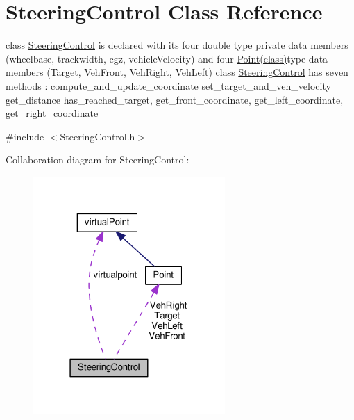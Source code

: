 \hypertarget{classSteeringControl}{}\section{Steering\+Control Class Reference}
\label{classSteeringControl}


class \hyperlink{classSteeringControl}{Steering\+Control} is declared with its four double type private data members (wheelbase, trackwidth, cgz, vehicle\+Velocity) and four \hyperlink{classPoint}{Point(class)}type data members (Target, Veh\+Front, Veh\+Right, Veh\+Left) class \hyperlink{classSteeringControl}{Steering\+Control} has seven methods \+: compute\+\_\+and\+\_\+update\+\_\+coordinate set\+\_\+target\+\_\+and\+\_\+veh\+\_\+velocity get\+\_\+distance has\+\_\+reached\+\_\+target, get\+\_\+front\+\_\+coordinate, get\+\_\+left\+\_\+coordinate, get\+\_\+right\+\_\+coordinate  




{\ttfamily \#include $<$Steering\+Control.\+h$>$}



Collaboration diagram for Steering\+Control\+:
\nopagebreak
\begin{figure}[H]
\begin{center}
\leavevmode
\includegraphics[width=207pt]{classSteeringControl__coll__graph}
\end{center}
\end{figure}
